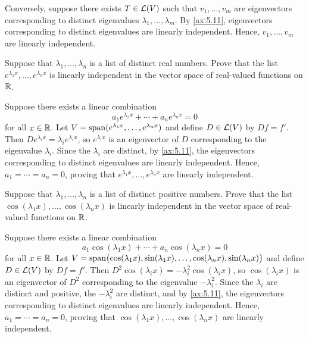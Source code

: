 \begin{exc}
\begin{solution}
Conversely, suppose there exists $T\in\mathcal{L}(V)$ such that $v_1,\dots,v_m$ are
eigenvectors corresponding to distinct eigenvalues
$\lambda_1,\dots,\lambda_m$. By \ref{ax:5.11}, eigenvectors corresponding to
distinct eigenvalues are linearly independent. Hence, $v_1,\dots,v_m$ are
linearly independent.
\end{solution}

\begin{exercise}
Suppose that $\lambda_1,\dots,\lambda_n$ is a list of distinct real numbers.
Prove that the list $e^{\lambda_1x},\dots,e^{\lambda_nx}$ is linearly
independent in the vector space of real-valued functions on $\mathbb{R}$.
\end{exercise}
\begin{solution}
Suppose there exists a linear combination
\[ a_1e^{\lambda_1x}+\cdots+a_ne^{\lambda_nx} = 0 \]
for all $x\in\mathbb{R}$. Let $V=\operatorname{span}(e^{\lambda_1x},\dots,e^{\lambda_nx})$ and define
$D\in\mathcal{L}(V)$ by $Df=f'$. Then $De^{\lambda_ix}=\lambda_ie^{\lambda_ix}$, so
$e^{\lambda_ix}$ is an eigenvector of $D$ corresponding to the eigenvalue
$\lambda_i$. Since the $\lambda_i$ are distinct, by \ref{ax:5.11}, the
eigenvectors corresponding to distinct eigenvalues are linearly independent.
Hence, $a_1=\cdots=a_n=0$, proving that $e^{\lambda_1x},\dots,e^{\lambda_nx}$
are linearly independent.
\end{solution}

\begin{exercise}
Suppose that $\lambda_1,\dots,\lambda_n$ is a list of distinct positive
numbers. Prove that the list $\cos(\lambda_1x),\dots,\cos(\lambda_nx)$ is
linearly independent in the vector space of real-valued functions on $\mathbb{R}$.
\end{exercise}
\begin{solution}
Suppose there exists a linear combination
\[ a_1\cos(\lambda_1x)+\cdots+a_n\cos(\lambda_nx) = 0 \]
for all $x\in\mathbb{R}$. Let
$V=\operatorname{span}\bigl(\cos(\lambda_1x),\sin(\lambda_1x),\dots,\cos(\lambda_nx),
\sin(\lambda_nx)\bigr)$ and define $D\in\mathcal{L}(V)$ by $Df=f'$. Then
$D^2\cos(\lambda_ix)=-\lambda_i^2\cos(\lambda_ix)$, so $\cos(\lambda_ix)$ is an
eigenvector of $D^2$ corresponding to the eigenvalue $-\lambda_i^2$. Since the
$\lambda_i$ are distinct and positive, the $-\lambda_i^2$ are distinct, and by
\ref{ax:5.11}, the eigenvectors corresponding to distinct eigenvalues are
linearly independent. Hence, $a_1=\cdots=a_n=0$, proving that
$\cos(\lambda_1x),\dots,\cos(\lambda_nx)$ are linearly independent.
\end{solution}


\end{exc}
